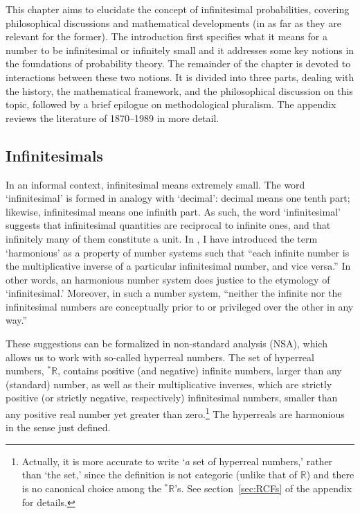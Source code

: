 This chapter aims to elucidate the concept of infinitesimal probabilities, covering philosophical discussions and mathematical developments (in as far as they are relevant for the former).
The introduction first specifies what it means for a number to be infinitesimal or infinitely small and it addresses some key notions in the foundations of probability theory.
The remainder of the chapter is devoted to interactions between these two notions. It is divided into three parts, dealing with the history, the mathematical framework, and the philosophical discussion on this topic, followed by a brief epilogue on methodological pluralism. The appendix reviews the literature of 1870--1989 in more detail.

\subsection*{Infinitesimals}\label{sec:infinitesimals}
In an informal context, infinitesimal means extremely small.
The word `infinitesimal' is formed in analogy with `decimal': decimal means one tenth part; likewise, infinitesimal means one infinith part. As such, the word `infinitesimal' suggests that infinitesimal quantities are reciprocal to infinite ones, and that infinitely many of them constitute a unit.
In \citet{Wenmackers:forthc}, I have introduced the term `harmonious' as a property of number systems such that ``each infinite number is the multiplicative inverse of a particular infinitesimal number, and vice versa.'' In other words, an harmonious number system does justice to the etymology of `infinitesimal.' Moreover, in such a number system, ``neither the infinite nor the infinitesimal numbers are conceptually prior to or privileged over the other in any way.''

These suggestions can be formalized in non-standard analysis (NSA), which allows us to work with so-called hyperreal numbers. The set of hyperreal numbers, ${^*} \mathbb{R}$, contains positive (and negative) infinite numbers, larger than any (standard) number, as well as their multiplicative inverses, which are strictly positive (or strictly negative, respectively) infinitesimal numbers, smaller than any positive real number yet greater than zero.\footnote{Actually, it is more accurate to write `\emph{a} set of hyperreal numbers,' rather than `the set,' since the definition is not categoric (unlike that of $\mathbb{R}$) and there is no canonical choice among the ${^*} \mathbb{R}$'s. See section~\ref{sec:RCFs} of the appendix for details.\label{fn:a-not-the}} The hyperreals are harmonious in the sense just defined.

